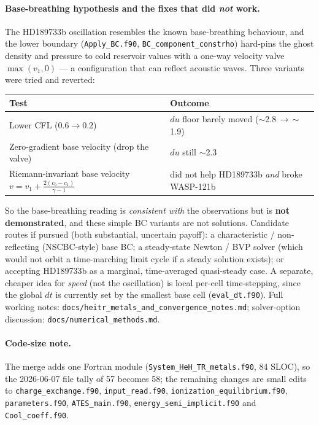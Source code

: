 \documentclass[english,a4paper]{kiseon_memo}
\begin{document}
\paragraph{Base-breathing hypothesis and the fixes that did \emph{not} work.}
The HD189733b oscillation resembles the known base-breathing behaviour, and the lower
boundary (\texttt{Apply\_BC.f90}, \texttt{BC\_component\_constrho}) hard-pins the ghost
density and pressure to cold reservoir values with a one-way velocity valve
$\max(v_1,0)$ --- a configuration that can reflect acoustic waves. Three variants were
tried and reverted:

\begin{center}\small
\begin{tabular}{@{}ll@{}}
\toprule
Test & Outcome \\
\midrule
Lower CFL ($0.6\to0.2$) & $du$ floor barely moved ($\sim$2.8\,$\to$\,$\sim$1.9) \\
Zero-gradient base velocity (drop the valve) & $du$ still $\sim$2.3 \\
Riemann-invariant base velocity $v=v_1+\tfrac{2(c_b-c_1)}{\gamma-1}$ & did not help HD189733b \emph{and} broke WASP-121b \\
\bottomrule
\end{tabular}
\end{center}

\noindent So the base-breathing reading is \emph{consistent with} the observations but
is \textbf{not demonstrated}, and these simple BC variants are not solutions. Candidate
routes if pursued (both substantial, uncertain payoff): a characteristic / non-reflecting
(NSCBC-style) base BC; a steady-state Newton / BVP solver (which would not orbit a
time-marching limit cycle if a steady solution exists); or accepting HD189733b as a
marginal, time-averaged quasi-steady case. A separate, cheaper idea for \emph{speed}
(not the oscillation) is local per-cell time-stepping, since the global $dt$ is currently
set by the smallest base cell (\texttt{eval\_dt.f90}). Full working notes:
\texttt{docs/heitr\_metals\_and\_convergence\_notes.md}; solver-option discussion:
\texttt{docs/numerical\_methods.md}.

\paragraph{Code-size note.} The merge adds one Fortran module
(\texttt{System\_HeH\_TR\_metals.f90}, 84 SLOC), so the 2026-06-07 file tally of 57
becomes 58; the remaining changes are small edits to \texttt{charge\_exchange.f90},
\texttt{input\_read.f90}, \texttt{ionization\_equilibrium.f90}, \texttt{parameters.f90},
\texttt{ATES\_main.f90}, \texttt{energy\_semi\_implicit.f90} and \texttt{Cool\_coeff.f90}.
\end{document}

